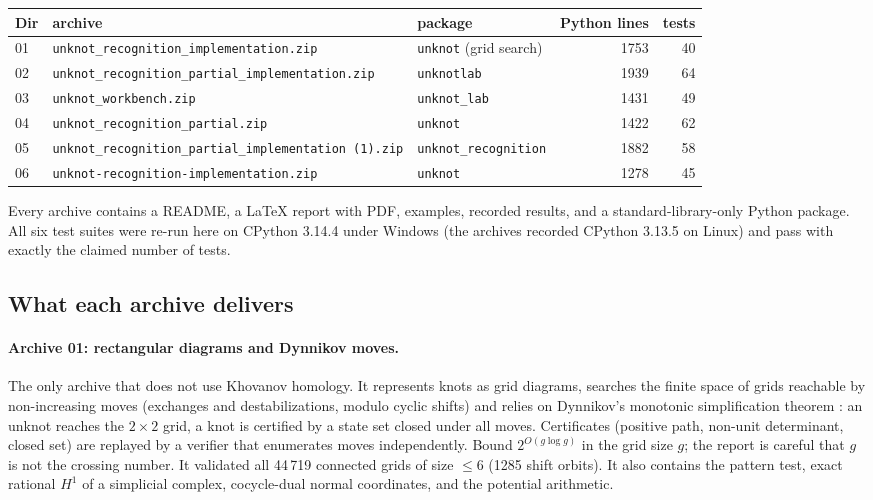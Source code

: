 \documentclass[11pt]{article}
\theoremstyle{remark}
\newcommand{\code}[1]{\texttt{#1}}
\begin{document}
\begin{center}\footnotesize
\begin{tabular}{@{}lllrr@{}}
\toprule
Dir & archive & package & Python lines & tests \\
\midrule
01 & \code{unknot\_recognition\_implementation.zip} & \code{unknot} (grid search) & 1753 & 40 \\
02 & \code{unknot\_recognition\_partial\_implementation.zip} & \code{unknotlab} & 1939 & 64 \\
03 & \code{unknot\_workbench.zip} & \code{unknot\_lab} & 1431 & 49 \\
04 & \code{unknot\_recognition\_partial.zip} & \code{unknot} & 1422 & 62 \\
05 & \code{unknot\_recognition\_partial\_implementation (1).zip} & \code{unknot\_recognition} & 1882 & 58 \\
06 & \code{unknot-recognition-implementation.zip} & \code{unknot} & 1278 & 45 \\
\bottomrule
\end{tabular}
\end{center}

Every archive contains a README, a LaTeX report with PDF, examples, recorded
results, and a standard-library-only Python package. All six test suites were
re-run here on CPython 3.14.4 under Windows (the archives recorded CPython
3.13.5 on Linux) and pass with exactly the claimed number of tests.

\subsection{What each archive delivers}

\paragraph{Archive 01: rectangular diagrams and Dynnikov moves.}
The only archive that does not use Khovanov homology. It represents knots as
grid diagrams, searches the finite space of grids reachable by
non-increasing moves (exchanges and destabilizations, modulo cyclic shifts)
and relies on Dynnikov's monotonic simplification theorem
\cite{dynnikov}: an unknot reaches the $2\times2$ grid, a knot is certified by
a state set closed under all moves. Certificates (positive path, non-unit
determinant, closed set) are replayed by a verifier that enumerates moves
independently. Bound $2^{O(g\log g)}$ in the grid size $g$; the report is
careful that $g$ is not the crossing number. It validated all 44\,719
connected grids of size $\le6$ (1285 shift orbits). It also contains the
pattern test, exact rational $H^1$ of a simplicial complex, cocycle-dual
normal coordinates, and the potential arithmetic.
\end{document}
